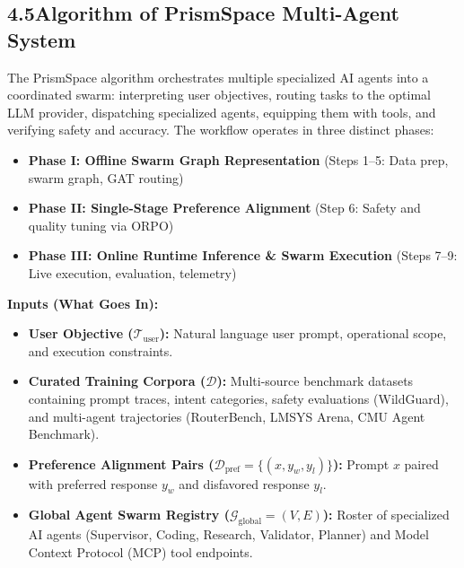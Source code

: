 \documentclass[11pt,a4paper]{article}
\begin{document}

\subsection*{4.5\quad Algorithm of PrismSpace Multi-Agent System}

The PrismSpace algorithm orchestrates multiple specialized AI agents into a coordinated swarm: interpreting user objectives, routing tasks to the optimal LLM provider, dispatching specialized agents, equipping them with tools, and verifying safety and accuracy. The workflow operates in three distinct phases:
\begin{itemize}[leftmargin=1.5em, itemsep=0.10em, topsep=0.04em]
    \item \textbf{Phase I: Offline Swarm Graph Representation} (Steps 1--5: Data prep, swarm graph, GAT routing)
    \item \textbf{Phase II: Single-Stage Preference Alignment} (Step 6: Safety and quality tuning via ORPO)
    \item \textbf{Phase III: Online Runtime Inference \& Swarm Execution} (Steps 7--9: Live execution, evaluation, telemetry)
\end{itemize}

\vspace{0.20em}
\textbf{Inputs (What Goes In):}
\begin{itemize}[leftmargin=1.5em, itemsep=0.10em, topsep=0.04em]
    \item \textbf{User Objective ($\mathcal{T}_{\text{user}}$):} Natural language user prompt, operational scope, and execution constraints.
    \item \textbf{Curated Training Corpora ($\mathcal{D}$):} Multi-source benchmark datasets containing prompt traces, intent categories, safety evaluations (WildGuard), and multi-agent trajectories (RouterBench, LMSYS Arena, CMU Agent Benchmark).
    \item \textbf{Preference Alignment Pairs ($\mathcal{D}_{\text{pref}} = \{(x, y_w, y_l)\}$):} Prompt $x$ paired with preferred response $y_w$ and disfavored response $y_l$.
    \item \textbf{Global Agent Swarm Registry ($\mathcal{G}_{\text{global}} = (V, E)$):} Roster of specialized AI agents (Supervisor, Coding, Research, Validator, Planner) and Model Context Protocol (MCP) tool endpoints.
\end{itemize}
\end{document}
